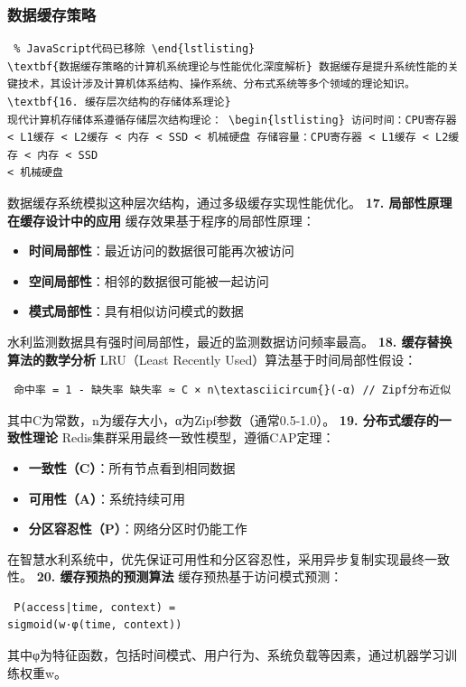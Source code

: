 \subsubsection{数据缓存策略}\label{ux6570ux636eux7f13ux5b58ux7b56ux7565} \begin{lstlisting} % JavaScript代码已移除 \end{lstlisting}
\textbf{数据缓存策略的计算机系统理论与性能优化深度解析} 数据缓存是提升系统性能的关键技术，其设计涉及计算机体系结构、操作系统、分布式系统等多个领域的理论知识。 \textbf{16. 缓存层次结构的存储体系理论}
现代计算机存储体系遵循存储层次结构理论： \begin{lstlisting} 访问时间：CPU寄存器 < L1缓存 < L2缓存 < 内存 < SSD < 机械硬盘 存储容量：CPU寄存器 < L1缓存 < L2缓存 < 内存 < SSD
< 机械硬盘 \end{lstlisting} 数据缓存系统模拟这种层次结构，通过多级缓存实现性能优化。 \textbf{17. 局部性原理在缓存设计中的应用} 缓存效果基于程序的局部性原理： \begin{itemize}
\tightlist \item \textbf{时间局部性}：最近访问的数据很可能再次被访问 \item \textbf{空间局部性}：相邻的数据很可能被一起访问 \item \textbf{模式局部性}：具有相似访问模式的数据
\end{itemize} 水利监测数据具有强时间局部性，最近的监测数据访问频率最高。 \textbf{18. 缓存替换算法的数学分析} LRU（Least Recently Used）算法基于时间局部性假设：
\begin{lstlisting} 命中率 = 1 - 缺失率 缺失率 ≈ C × n\textasciicircum{}(-α) // Zipf分布近似 \end{lstlisting}
其中C为常数，n为缓存大小，α为Zipf参数（通常0.5-1.0）。 \textbf{19. 分布式缓存的一致性理论} Redis集群采用最终一致性模型，遵循CAP定理： \begin{itemize} \tightlist \item
\textbf{一致性（C）}：所有节点看到相同数据 \item \textbf{可用性（A）}：系统持续可用\\ \item \textbf{分区容忍性（P）}：网络分区时仍能工作 \end{itemize}
在智慧水利系统中，优先保证可用性和分区容忍性，采用异步复制实现最终一致性。 \textbf{20. 缓存预热的预测算法} 缓存预热基于访问模式预测： \begin{lstlisting} P(access|time, context) =
sigmoid(w·φ(time, context)) \end{lstlisting} 其中φ为特征函数，包括时间模式、用户行为、系统负载等因素，通过机器学习训练权重w。
